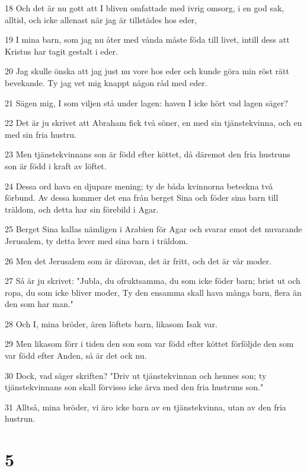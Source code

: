 \par 18 Och det är nu gott att I bliven omfattade med ivrig omsorg, i en god sak, alltid, och icke allenast när jag är tillstädes hos eder,
\par 19 I mina barn, som jag nu åter med vånda måste föda till livet, intill dess att Kristus har tagit gestalt i eder.
\par 20 Jag skulle önska att jag just nu vore hos eder och kunde göra min röst rätt bevekande. Ty jag vet mig knappt någon råd med eder.
\par 21 Sägen mig, I som viljen stå under lagen: haven I icke hört vad lagen säger?
\par 22 Det är ju skrivet att Abraham fick två söner, en med sin tjänstekvinna, och en med sin fria hustru.
\par 23 Men tjänstekvinnans son är född efter köttet, då däremot den fria hustruns son är född i kraft av löftet.
\par 24 Dessa ord hava en djupare mening; ty de båda kvinnorna beteckna två förbund. Av dessa kommer det ena från berget Sina och föder sina barn till träldom, och detta har sin förebild i Agar.
\par 25 Berget Sina kallas nämligen i Arabien för Agar och svarar emot det nuvarande Jerusalem, ty detta lever med sina barn i träldom.
\par 26 Men det Jerusalem som är därovan, det är fritt, och det är vår moder.
\par 27 Så är ju skrivet: "Jubla, du ofruktsamma, du som icke föder barn; brist ut och ropa, du som icke bliver moder, Ty den ensamma skall hava många barn, flera än den som har man."
\par 28 Och I, mina bröder, ären löftets barn, likasom Isak var.
\par 29 Men likasom förr i tiden den son som var född efter köttet förföljde den som var född efter Anden, så är det ock nu.
\par 30 Dock, vad säger skriften? "Driv ut tjänstekvinnan och hennes son; ty tjänstekvinnans son skall förvisso icke ärva med den fria hustruns son."
\par 31 Alltså, mina bröder, vi äro icke barn av en tjänstekvinna, utan av den fria hustrun.

\chapter{5}

